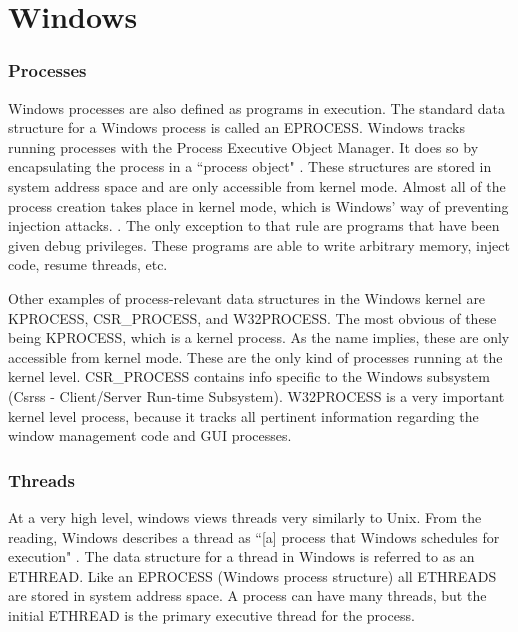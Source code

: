 \documentclass[10pt,draftclsnofoot,onecolumn]{IEEEtran}
\begin{document}
\section{Windows}

\subsubsection{Processes}
\label{sub:Process Windows}
\par Windows processes are also defined as programs in execution.
The standard data structure for a Windows process is called an EPROCESS.
Windows tracks running processes with the Process Executive Object Manager.
It does so by encapsulating the process in a ``process object" \cite{win:1}.
These structures are stored in system address space and are only accessible from kernel mode.
Almost all of the process creation takes place in kernel mode, which is Windows' way of preventing injection attacks. \cite{win:1}.
The only exception to that rule are programs that have been given debug privileges.
These programs are able to write arbitrary memory, inject code, resume threads, etc. \cite{win:1}

\par Other examples of process-relevant data structures in the Windows kernel are KPROCESS, CSR\_PROCESS, and W32PROCESS.
The most obvious of these being KPROCESS, which is a kernel process.
As the name implies, these are only accessible from kernel mode.
These are the only kind of processes running at the kernel level.
CSR\_PROCESS contains info specific to the Windows subsystem (Csrss - Client/Server Run-time Subsystem).
W32PROCESS is a very important kernel level process, because it tracks all pertinent information regarding the window management code and GUI processes.

\subsubsection{Threads}
\label{sub:Thread Windows}
\par At a very high level, windows views threads very similarly to Unix.
From the reading, Windows describes a thread as ``[a] process that Windows schedules for execution" \cite{win:1}.
The data structure for a thread in Windows is referred to as an ETHREAD.
Like an EPROCESS (Windows process structure) all ETHREADS are stored in system address space.
A process can have many threads, but the initial ETHREAD is the primary executive thread for the process.
\end{document}
